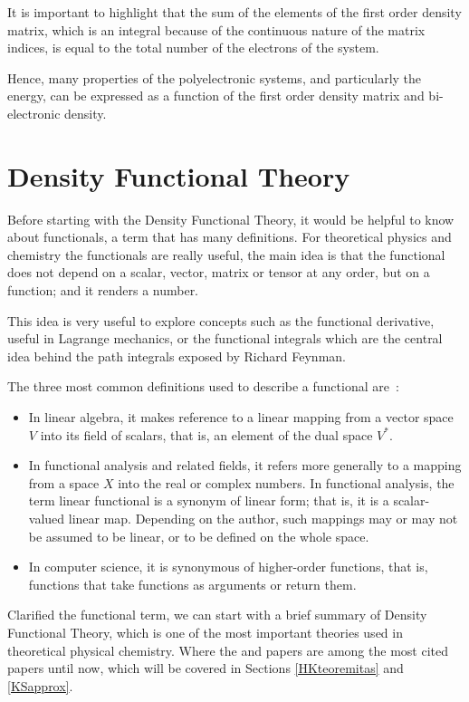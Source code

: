 It is important to highlight that the sum of the elements of the first order
density matrix, which is an integral because of the continuous nature of the
matrix indices, is equal to the total number of the electrons of the system.

Hence, many properties of the polyelectronic systems, and particularly the
energy, can be expressed as a function of the first order density matrix and
bi-electronic density.

\section{Density Functional Theory}

Before starting with the Density Functional Theory, it would be helpful to know
about functionals, a term that has many definitions. For theoretical physics
and chemistry the functionals are really useful, the main idea is that the
functional does not depend on a scalar, vector, matrix or tensor at any order,
but on a function; and it renders a number.

This idea is very useful to explore concepts such as the functional derivative,
useful in Lagrange mechanics, or the functional integrals which are the central
idea behind the path integrals exposed by Richard Feynman.

The three most common definitions used to describe a functional are~\cite{1990}:

\begin{itemize}
\item In linear algebra, it makes reference to a linear mapping from a vector
space $V$ into its field of scalars, that is, an element of the dual space
$V^{*}$.
\item In functional analysis and related fields, it refers more generally to a
mapping from a space $X$ into the real or complex numbers. In functional
analysis, the term linear functional is a synonym of linear form; that is, it
is a scalar-valued linear map. Depending on the author, such mappings may or
may not be assumed to be linear, or to be defined on the whole space.
\item In computer science, it is synonymous of higher-order functions, that is,
functions that take functions as arguments or return them.
\end{itemize}

Clarified the functional term, we can start with a brief summary of Density
Functional Theory, which is one of the most important theories used in
theoretical physical chemistry. Where the \citet*{Hohenberg1964} and
\citet*{Kohn1965} papers are among the most cited papers until now, which will
be covered in Sections \ref{HKteoremitas} and \ref{KSapprox}.

